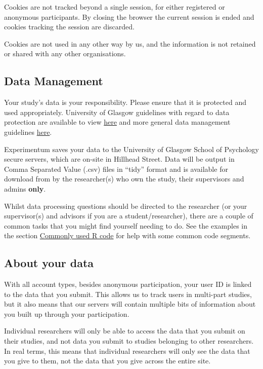 \documentclass[]{book}
\begin{document}
Cookies are not tracked beyond a single session, for either registered or anonymous participants. By closing the browser the current session is ended and cookies tracking the session are discarded.

Cookies are not used in any other way by us, and the information is not retained or shared with any other organisations.

\hypertarget{data-management}{%
\subsection*{Data Management}\label{data-management}}

Your study's data is your responsibility. Please ensure that it is protected and used appropriately. University of Glasgow guidelines with regard to data protection are available to view \href{https://www.gla.ac.uk/myglasgow/dpfoioffice/}{here} and more general data management guidelines \href{https://www.gla.ac.uk/myglasgow/datamanagement/rdmatglasgow/}{here}.

Experimentum saves your data to the University of Glasgow School of Psychology secure servers, which are on-site in Hillhead Street. Data will be output in Comma Separated Value (.csv) files in ``tidy'' format and is available for download from by the researcher(s) who own the study, their supervisors and admins \textbf{only}.

Whilst data processing questions should be directed to the researcher (or your supervisor(s) and advisors if you are a student/researcher), there are a couple of common tasks that you might find yourself needing to do. See the examples in the section \protect\hyperlink{commoncode}{Commonly used R code} for help with some common code segments.

\hypertarget{about-your-data}{%
\subsection*{About your data}\label{about-your-data}}

With all account types, besides anonymous participation, your user ID is linked to the data that you submit. This allows us to track users in multi-part studies, but it also means that our servers will contain multiple bits of information about you built up through your participation.

Individual researchers will only be able to access the data that you submit on their studies, and not data you submit to studies belonging to other researchers. In real terms, this means that individual researchers will only see the data that you give to them, not the data that you give across the entire site.
\end{document}
